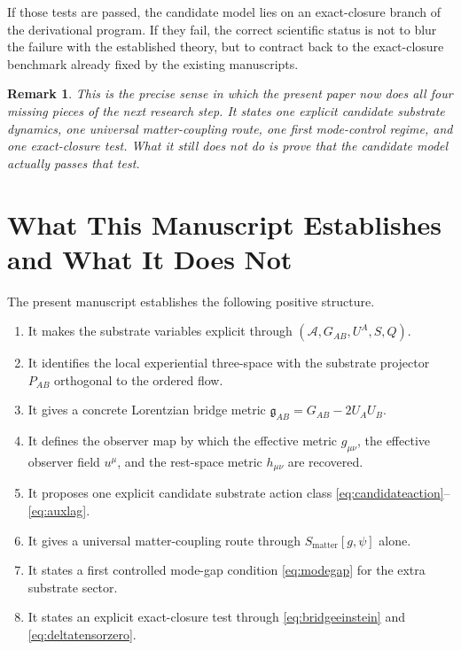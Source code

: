 \documentclass[11pt]{article}
\newcommand{\Sub}{\mathcal{A}}
\newcommand{\BridgeMetric}{\mathfrak{g}}
\newtheorem{remark}{Remark}
\begin{document}
If those tests are passed, the candidate model lies on an exact-closure branch of the derivational program. If they fail, the correct scientific status is not to blur the failure with the established theory, but to contract back to the exact-closure benchmark already fixed by the existing manuscripts.

\begin{remark}
This is the precise sense in which the present paper now does all four missing pieces of the next research step. It states one explicit candidate substrate dynamics, one universal matter-coupling route, one first mode-control regime, and one exact-closure test. What it still does not do is prove that the candidate model actually passes that test.
\end{remark}

\section{What This Manuscript Establishes and What It Does Not}

The present manuscript establishes the following positive structure.
\begin{enumerate}
    \item It makes the substrate variables explicit through \((\Sub,G_{AB},U^A,S,Q)\).
    \item It identifies the local experiential three-space with the substrate projector \(P_{AB}\) orthogonal to the ordered flow.
    \item It gives a concrete Lorentzian bridge metric \(\BridgeMetric_{AB}=G_{AB}-2U_AU_B\).
    \item It defines the observer map by which the effective metric \(g_{\mu\nu}\), the effective observer field \(u^\mu\), and the rest-space metric \(h_{\mu\nu}\) are recovered.
    \item It proposes one explicit candidate substrate action class \eqref{eq:candidateaction}--\eqref{eq:auxlag}.
    \item It gives a universal matter-coupling route through \(S_{\mathrm{matter}}[g,\psi]\) alone.
    \item It states a first controlled mode-gap condition \eqref{eq:modegap} for the extra substrate sector.
    \item It states an explicit exact-closure test through \eqref{eq:bridgeeinstein} and \eqref{eq:deltatensorzero}.
\end{enumerate}
\end{document}
